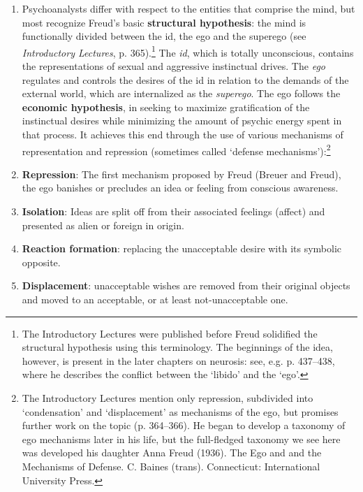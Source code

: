 \begin{refsection}
\begin{enumerate}
\item Psychoanalysts differ with respect to the entities that comprise the mind, but most recognize Freud's basic \textbf{structural hypothesis}: the mind is functionally divided between the id, the ego and the superego (see \emph{Introductory Lectures}, p. 365).\footnote{The Introductory Lectures were published before Freud solidified the structural hypothesis using this terminology. The beginnings of the idea, however, is present in the later chapters on neurosis: see, e.g. p. 437--438, where he describes the conflict between the `libido' and the `ego'.} The \emph{id}, which is totally unconscious, contains the representations of sexual and aggressive instinctual drives. The \emph{ego} regulates and controls the desires of the id in relation to the demands of the external world, which are internalized as the \emph{superego}. The ego follows the \textbf{economic hypothesis}, in seeking to maximize gratification of the instinctual desires while minimizing the amount of psychic energy spent in that process. It achieves this end through the use of various mechanisms of representation and repression (sometimes called `defense mechanisms'):\footnote{The Introductory Lectures mention only repression, subdivided into `condensation' and `displacement' as mechanisms of the ego, but promises further work on the topic (p. 364--366). He began to develop a taxonomy of ego mechanisms later in his life, but the full-fledged taxonomy we see here was developed his daughter Anna Freud (1936). The Ego and and the Mechanisms of Defense. C. Baines (trans). Connecticut: International University Press.}

\item \textbf{Repression}: The first mechanism proposed by Freud (Breuer and Freud), the ego banishes or precludes an idea or feeling from conscious awareness.

\item \textbf{Isolation}: Ideas are split off from their associated feelings (affect) and presented as alien or foreign in origin.

\item \textbf{Reaction formation}: replacing the unacceptable desire with its symbolic opposite.

\item \textbf{Displacement}: unacceptable wishes are removed from their original objects and moved to an acceptable, or at least not-unacceptable one.


\end{enumerate}
\end{refsection}
